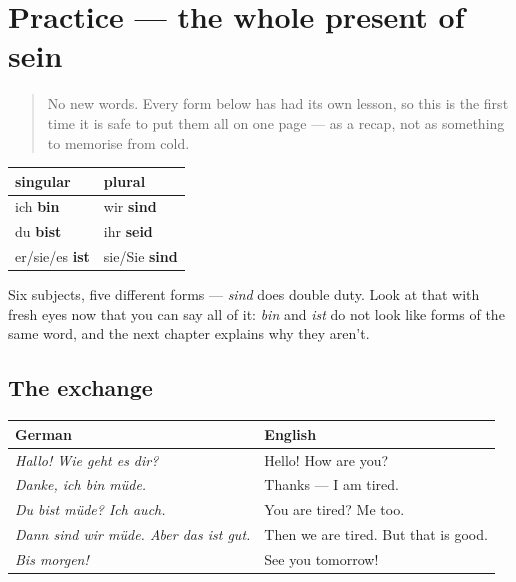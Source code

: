 \section[Practice]{Practice — the whole present of sein}

\label{lesson:GE-C16-praesens-practice}



\begin{quote}
No new words. Every form below has had its own lesson, so this is the first time it is safe to put them all on one page — as a recap, not as something to memorise from cold.
\end{quote}

\begin{grammarlens}[title={Grammar Lens: the six forms, assembled}]
\noindent
\begin{tabularx}{\linewidth}{@{}>{\raggedright\arraybackslash}X>{\raggedright\arraybackslash}X@{}}
\toprule
\textbf{singular} & \textbf{plural} \\
\midrule
ich \textbf{bin} & wir \textbf{sind} \\
du \textbf{bist} & ihr \textbf{seid} \\
er/sie/es \textbf{ist} & sie/Sie \textbf{sind} \\
\bottomrule
\end{tabularx}

Six subjects, five different forms — \emph{sind} does double duty. Look at that with fresh eyes now that you can say all of it: \emph{bin} and \emph{ist} do not look like forms of the same word, and the next chapter explains why they aren't.
\end{grammarlens}

\subsection*{The exchange}
\noindent
\begin{tabularx}{\linewidth}{@{}>{\raggedright\arraybackslash}X>{\raggedright\arraybackslash}X@{}}
\toprule
\textbf{German} & \textbf{English} \\
\midrule
\emph{Hallo! Wie geht es dir?} & Hello! How are you? \\
\emph{Danke, ich bin müde.} & Thanks — I am tired. \\
\emph{Du bist müde? Ich auch.} & You are tired? Me too. \\
\emph{Dann sind wir müde. Aber das ist gut.} & Then we are tired. But that is good. \\
\emph{Bis morgen!} & See you tomorrow! \\
\bottomrule
\end{tabularx}


